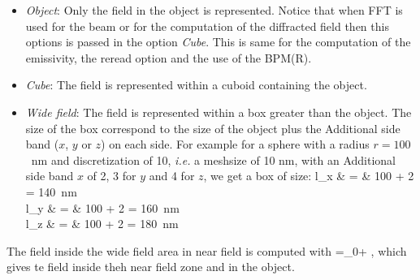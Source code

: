 \begin{itemize}

\item {\it Object}: Only the field in the object is
  represented. Notice that when FFT is used for the beam or for the
  computation of the diffracted field then this options is passed in
  the option {\it Cube}. This is same for the computation of the
  emissivity, the reread option and the use of the BPM(R).

\item {\it Cube}: The field is represented within a cuboid containing
  the object.

\item {\it Wide field}: The field is represented within a box greater
  than the object.  The size of the box correspond to the size of the
  object plus the Additional side band ($x$, $y$ or $z$) on each
  side. For example for a sphere with a radius $r=100$~nm and
  discretization of 10, {\it i.e.} a meshsize of 10 nm, with an
  Additional side band $x$ of 2, 3 for $y$ and 4 for $z$, we get a box
  of size:
  \be l_x & = & 100 + 2  = 140~{\rm nm} \\
  l_y & = & 100 + 2  = 160~{\rm nm} \\
  l_z & = & 100 + 2  = 180~{\rm nm}
  \ee
\end{itemize}
The field inside the wide field area in near field is computed with
  \be {}=_0+  , \ee
which gives te field inside theh near field zone and in the object.







